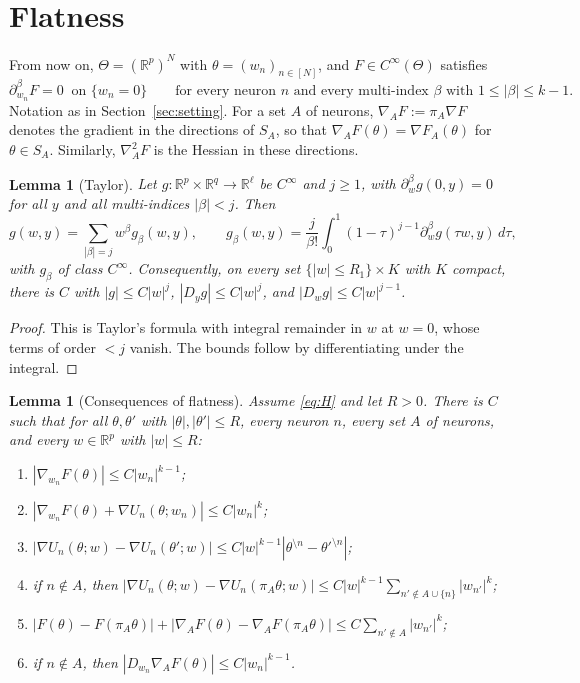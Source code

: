 \documentclass[11pt]{article}
\newtheorem{lemma}[theorem]{Lemma}
\theoremstyle{definition}
\theoremstyle{remark}
\numberwithin{equation}{section}
\newcommand{\R}{\mathbb{R}}
\newcommand{\sm}{\setminus}
\begin{document}
\section{Flatness}\label{sec:flatness}

From now on, $\Theta=(\R^p)^N$ with $\theta=(w_n)_{n\in[N]}$, and $F\in C^\infty(\Theta)$ satisfies
\begin{equation}\label{eq:H}\tag{H}
\partial^\beta_{w_n}F=0\ \text{ on }\{w_n=0\}\qquad\text{for every neuron $n$ and every multi-index $\beta$ with $1\le|\beta|\le k-1$.}
\end{equation}
Notation as in Section~\ref{sec:setting}. For a set $A$ of neurons, $\nabla_AF:=\pi_A\nabla F$ denotes the gradient in the directions of $S_A$, so that $\nabla_AF(\theta)=\nabla F_A(\theta)$ for $\theta\in S_A$. Similarly, $\nabla^2_AF$ is the Hessian in these directions.

\begin{lemma}[Taylor]\label{lem:taylor}
Let $g\colon\R^p\times\R^q\to\R^\ell$ be $C^\infty$ and $j\ge1$, with $\partial_w^\beta g(0,y)=0$ for all $y$ and all multi-indices $|\beta|<j$. Then
\[
g(w,y)=\sum_{|\beta|=j}w^\beta g_\beta(w,y),\qquad g_\beta(w,y)=\frac{j}{\beta!}\int_0^1(1-\tau)^{j-1}\partial_w^\beta g(\tau w,y)\,d\tau,
\]
with $g_\beta$ of class $C^\infty$. Consequently, on every set $\{|w|\le R_1\}\times K$ with $K$ compact, there is $C$ with $|g|\le C|w|^j$, $|D_yg|\le C|w|^j$, and $|D_wg|\le C|w|^{j-1}$.
\end{lemma}

\begin{proof}
This is Taylor's formula with integral remainder in $w$ at $w=0$, whose terms of order $<j$ vanish. The bounds follow by differentiating under the integral.
\end{proof}

\begin{lemma}[Consequences of flatness]\label{lem:flat}
Assume \eqref{eq:H} and let $R>0$. There is $C$ such that for all $\theta,\theta'$ with $|\theta|,|\theta'|\le R$, every neuron $n$, every set $A$ of neurons, and every $w\in\R^p$ with $|w|\le R$:
\begin{enumerate}[label=\textup{(\alph*)}]
\item $|\nabla_{w_n}F(\theta)|\le C|w_n|^{k-1}$;
\item $|\nabla_{w_n}F(\theta)+\nabla U_n(\theta;w_n)|\le C|w_n|^k$;
\item $|\nabla U_n(\theta;w)-\nabla U_n(\theta';w)|\le C|w|^{k-1}|\theta^{\sm n}-\theta'^{\sm n}|$;
\item if $n\notin A$, then $|\nabla U_n(\theta;w)-\nabla U_n(\pi_A\theta;w)|\le C|w|^{k-1}\sum_{n'\notin A\cup\{n\}}|w_{n'}|^k$;
\item $|F(\theta)-F(\pi_A\theta)|+|\nabla_AF(\theta)-\nabla_AF(\pi_A\theta)|\le C\sum_{n'\notin A}|w_{n'}|^k$;
\item if $n\notin A$, then $|D_{w_n}\nabla_AF(\theta)|\le C|w_n|^{k-1}$.
\end{enumerate}
\end{lemma}
\end{document}
